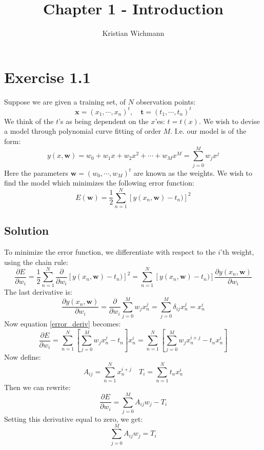 \documentclass[12pt, a4paper]{article}
\title{Chapter 1 - Introduction}
\author{Kristian Wichmann}
\numberwithin{equation}{section}
\begin{document}
\maketitle

\section{Exercise 1.1}
Suppose we are given a training set, of $N$ observation points:
\begin{equation}
\mathbf{x}=(x_1,\cdots,x_n)^t,\quad \mathbf{t}=(t_1,\cdots,t_n)^t
\end{equation}
We think of the $t$'s as being dependent on the $x$'es: $t=t(x)$. We wish to devise a model through polynomial curve fitting of order $M$. I.e. our model is of the form:
\begin{equation}
y(x,\mathbf{w})=w_0+w_1 x+w_2 x^2+\cdots+w_M x^M=\sum_{j=0}^M w_j x^j
\end{equation} 
Here the parameters $\mathbf{w}=(w_0,\cdots,w_M)^t$ are known as the weights. We wish to find the model which minimizes the following error function:
\begin{equation}
E(\mathbf{w})=\frac{1}{2}\sum_{n=1}^N\left[y(x_n,\mathbf{w})-t_n)\right]^2
\end{equation}

\subsection{Solution}
To minimize the error function, we differentiate with respect to the $i$'th weight, using the chain rule:
\begin{equation}
\label{error_deriv}
\frac{\partial E}{\partial w_i}=\frac{1}{2}\sum_{n=1}^N\frac{\partial}{\partial w_i}\left[y(x_n,\mathbf{w})-t_n)\right]^2=\sum_{n=1}^N\left[y(x_n,\mathbf{w})-t_n)\right]\frac{\partial y(x_n,\mathbf{w})}{\partial w_i}
\end{equation}
The last derivative is:
\begin{equation}
\frac{\partial y(x_n,\mathbf{w})}{\partial w_i}=\frac{\partial}{\partial w_i}\sum_{j=0}^M w_j x_n^j=\sum_{j=0}^M \delta_{ij}x_n^j=x_n^i
\end{equation}
Now equation \ref{error_deriv} becomes:
\begin{equation}
\frac{\partial E}{\partial w_i}=\sum_{n=1}^N\left[\sum_{j=0}^M w_j x_n^j-t_n\right]x_n^i=\sum_{n=1}^N\left[\sum_{j=0}^M w_j x_n^{i+j}-t_n x_n^i\right]
\end{equation}
Now define:
\begin{equation}
A_{ij}=\sum_{n=1}^N x_n^{i+j}\quad T_i=\sum_{n=1}^N t_n x_n^i
\end{equation}
Then we can rewrite:
\begin{equation}
\label{deriv_rewritten}
\frac{\partial E}{\partial w_i}=\sum_{j=0}^M A_{ij}w_j-T_i
\end{equation}
Setting this derivative equal to zero, we get:
\begin{equation}
\sum_{j=0}^M A_{ij}w_j=T_i
\end{equation}
\end{document}
